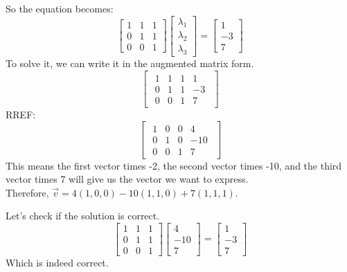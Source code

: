 \documentclass[oneside]{book}
\begin{document}
{    So the equation becomes:
    \[
        \begin{bmatrix}
            1 & 1 & 1\\
            0 & 1 & 1\\
            0 & 0 & 1
        \end{bmatrix}
        \begin{bmatrix}
            \lambda_1\\\lambda_2\\\lambda_3
        \end{bmatrix}
        =
        \begin{bmatrix}
            1\\-3\\7
        \end{bmatrix}
    \]
    To solve it, we can write it in the augmented matrix form.\\
    \[
        \begin{bmatrix}
            \begin{array}{ccc|c}
                1 & 1 & 1 & 1\\
                0 & 1 & 1 & -3\\
                0 & 0 & 1 & 7
            \end{array}
        \end{bmatrix}
    \]
    RREF:
    \[
        \begin{bmatrix}
            \begin{array}{ccc|c}
                1 & 0 & 0 & 4\\
                0 & 1 & 0 & -10\\
                0 & 0 & 1 & 7
            \end{array}
        \end{bmatrix}
    \]
    This means the first vector times -2, the second vector times -10, and the third vector times 7 will give us the vector we want to express.\\
    Therefore, $\boxed{\vec{v} = 4(1,0,0) - 10(1,1,0) + 7(1,1,1)}$.

    Let's check if the solution is correct.\\
    \[
        \begin{bmatrix}
            1 & 1 & 1\\
            0 & 1 & 1\\
            0 & 0 & 1
        \end{bmatrix} 
        \begin{bmatrix}
            4\\-10\\7
        \end{bmatrix}
        =
        \begin{bmatrix}
            1\\-3\\7
        \end{bmatrix}  
    \]
    Which is indeed correct.
}
\end{document}
